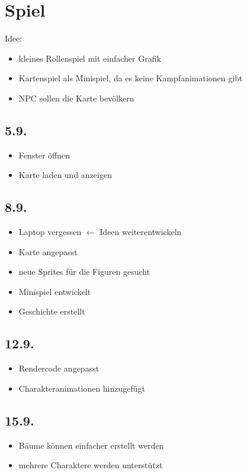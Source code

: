 \documentclass{scrreprt}
\begin{document}
	\chapter*{Spiel}
	Idee:
	\begin{itemize}
		\item kleines Rollenspiel mit einfacher Grafik
		\item Kartenspiel als Minispiel, da es keine Kampfanimationen gibt
		\item NPC sollen die Karte bevölkern
	\end{itemize}

	\section*{5.9.}
	\begin{itemize}
		\item Fenster öffnen
		\item Karte laden und anzeigen
	\end{itemize}

	\section*{8.9.}
	\begin{itemize}
		\item Laptop vergessen $\leftarrow$ Ideen weiterentwickeln
		\item Karte angepasst
		\item neue Sprites für die Figuren gesucht
		\item Minispiel entwickelt
		\item Geschichte erstellt
	\end{itemize}

	\section*{12.9.}
	\begin{itemize}
		\item Rendercode angepasst
		\item Charakteranimationen hinzugefügt
	\end{itemize}

	\section*{15.9.}
	\begin{itemize}
		\item Bäume können einfacher erstellt werden
		\item mehrere Charaktere werden unterstützt
	\end{itemize}
\end{document}

